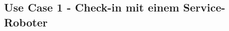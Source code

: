 \documentclass[
  ngerman           %
  ,twoside          %
  ,11pt
  ,pdftex
]{report}
\begin{document}
\chapter{}
\label{appendix:persona}
\begin{landscape}

\end{landscape}
\begin{landscape}

\end{landscape}
\begin{landscape}

\end{landscape}

\chapter{}
\label{appendix:user-story-uc1}
%
\section*{Use Case 1 - Check-in mit einem Service-Roboter}
\end{document}
